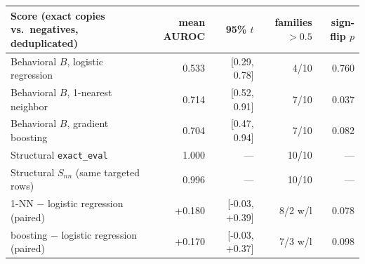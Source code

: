 \begin{tabular}{lrrrr}\toprule
Score (exact copies vs.\ negatives, deduplicated) & mean AUROC & 95\% $t$ & families $>0.5$ & sign-flip $p$\\\midrule
Behavioral $B$, logistic regression & 0.533 & [0.29, 0.78] & 4/10 & 0.760\\
Behavioral $B$, 1-nearest neighbor & 0.714 & [0.52, 0.91] & 7/10 & 0.037\\
Behavioral $B$, gradient boosting & 0.704 & [0.47, 0.94] & 7/10 & 0.082\\
Structural \texttt{exact\_eval} & 1.000 & --- & 10/10 & ---\\
Structural $S_{nn}$ (same targeted rows) & 0.996 & --- & 10/10 & ---\\
\midrule
1-NN $-$ logistic regression (paired) & +0.180 & [-0.03, +0.39] & 8/2 w/l & 0.078\\
boosting $-$ logistic regression (paired) & +0.170 & [-0.03, +0.37] & 7/3 w/l & 0.098\\
\bottomrule\end{tabular}
